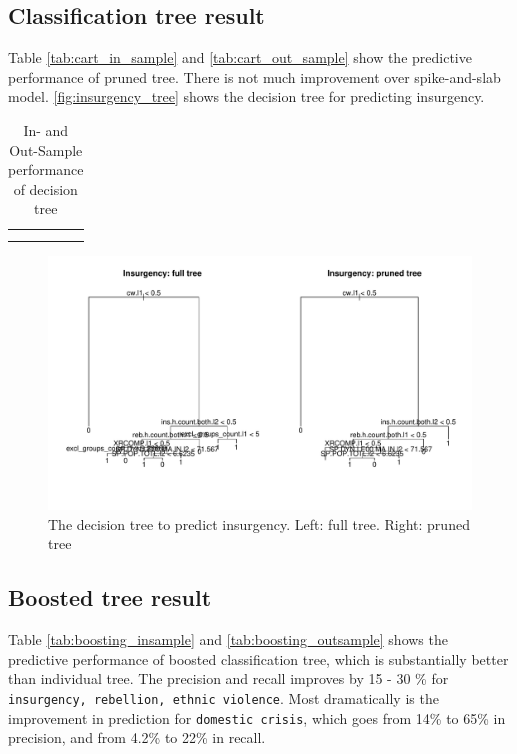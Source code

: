 \documentclass{article}
\begin{document}
\subsection{Classification tree result}

Table \autoref{tab:cart_in_sample} and \autoref{tab:cart_out_sample} show the predictive performance of pruned tree. There is not much improvement over spike-and-slab model. \autoref{fig:insurgency_tree} shows the decision tree for predicting insurgency.							

\begin{table}[H]
\centering
\begin{tabular}{c}
\subfloat[In-Sample]{\label{tab:cart_in_sample}
	}\\
\subfloat[Out-Sample]{\label{tab:cart_out_sample}
	}
\end{tabular}
\caption{In- and Out-Sample performance of decision tree}
\end{table}

\begin{figure}[H]
\includegraphics[width=\textwidth]{fig/insurgency_tree}
\caption{The decision tree to predict insurgency. Left: full tree. Right: pruned tree}
\label{fig:insurgency_tree}
\end{figure}

\subsection{Boosted tree result}

Table \autoref{tab:boosting_insample} and \autoref{tab:boosting_outsample} shows the predictive performance of boosted classification tree, which is substantially better than individual tree. The precision and recall improves by 15 - 30 \% for \verb|insurgency, rebellion, ethnic violence|. Most dramatically is the improvement in prediction for \verb|domestic crisis|, which goes from 14\% to 65\% in precision, and from 4.2\% to 22\% in recall.
\end{document}
